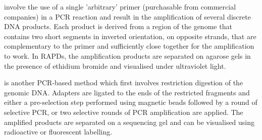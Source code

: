 \documentclass[
  ignorenonframetext,
  aspectratio=169]{beamer}
\begin{document}
\begin{frame}{}
\protect\hypertarget{section-3}{}
\begin{description}
\small
\item[Random-amplified polymorphic DNA (RAPDs)] involve the use of a single 'arbitrary' primer (purchasable from commercial companies) in a PCR reaction and result in the amplification of several discrete DNA products. Each product is derived from a region of the genome that contains two short segments in inverted orientation, on opposite strands, that are complementary to the primer and sufficiently close together for the amplification to work. In RAPDs, the amplification products are separated on agarose gels in the presence of ethidium bromide and visualised under ultraviolet light.
\item[Amplified fragment length polymorphism(AFLP)] is another PCR-based method which first involves restriction digestion of the genomic DNA. Adapters are ligated to the ends of the restricted fragments and either a pre-selection step performed using magnetic beads followed by a round of selective PCR, or two selective rounds of PCR amplification are applied. The amplified products are separated on a sequencing gel and can be visualised using radioactive or fluorescent labelling.
\end{description}
\end{frame}
\end{document}
